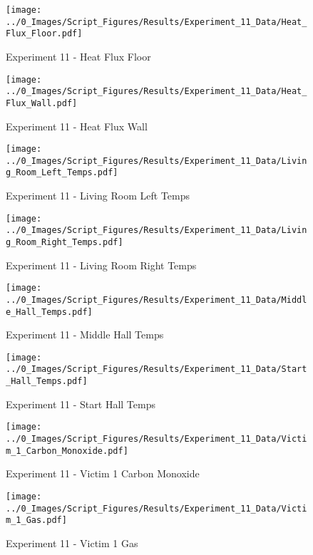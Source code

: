 	\begin{figure}[H]
		\centering
		\texttt{[image: ../0\_Images/Script\_Figures/Results/Experiment\_11\_Data/Heat\_Flux\_Floor.pdf]}
		\caption[]{Experiment 11 - Heat Flux Floor}
	\end{figure}
 
	\clearpage

	\begin{figure}[H]
		\centering
		\texttt{[image: ../0\_Images/Script\_Figures/Results/Experiment\_11\_Data/Heat\_Flux\_Wall.pdf]}
		\caption[]{Experiment 11 - Heat Flux Wall}
	\end{figure}
 

	\begin{figure}[H]
		\centering
		\texttt{[image: ../0\_Images/Script\_Figures/Results/Experiment\_11\_Data/Living\_Room\_Left\_Temps.pdf]}
		\caption[]{Experiment 11 - Living Room Left Temps}
	\end{figure}
 
	\clearpage

	\begin{figure}[H]
		\centering
		\texttt{[image: ../0\_Images/Script\_Figures/Results/Experiment\_11\_Data/Living\_Room\_Right\_Temps.pdf]}
		\caption[]{Experiment 11 - Living Room Right Temps}
	\end{figure}
 

	\begin{figure}[H]
		\centering
		\texttt{[image: ../0\_Images/Script\_Figures/Results/Experiment\_11\_Data/Middle\_Hall\_Temps.pdf]}
		\caption[]{Experiment 11 - Middle Hall Temps}
	\end{figure}
 
	\clearpage

	\begin{figure}[H]
		\centering
		\texttt{[image: ../0\_Images/Script\_Figures/Results/Experiment\_11\_Data/Start\_Hall\_Temps.pdf]}
		\caption[]{Experiment 11 - Start Hall Temps}
	\end{figure}
 

	\begin{figure}[H]
		\centering
		\texttt{[image: ../0\_Images/Script\_Figures/Results/Experiment\_11\_Data/Victim\_1\_Carbon\_Monoxide.pdf]}
		\caption[]{Experiment 11 - Victim 1 Carbon Monoxide}
	\end{figure}
 
	\clearpage

	\begin{figure}[H]
		\centering
		\texttt{[image: ../0\_Images/Script\_Figures/Results/Experiment\_11\_Data/Victim\_1\_Gas.pdf]}
		\caption[]{Experiment 11 - Victim 1 Gas}
	\end{figure}
 

